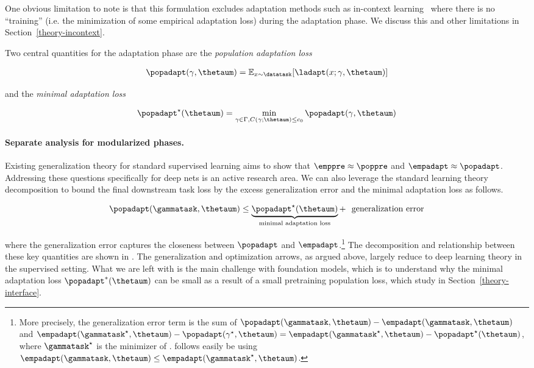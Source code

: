 One obvious limitation to note is that this formulation excludes adaptation methods such as in-context learning~\citep{brown2020gpt3} where there is no ``training'' (i.e. the minimization of some empirical adaptation loss) during the adaptation phase. We discuss this and other limitations in Section~\ref{theory-incontext}. 

Two central quantities for the adaptation phase are the \textit{population adaptation loss}

\begin{align}
    \popadapt(\gamma, \thetaum) = \ensuremath{\mathbb{E}}_{x\sim\datatask}[ \ladapt(x; \gamma,\thetaum)]
\end{align}

and the \emph{minimal adaptation loss}

\begin{align}
    \popadapt^\star(\thetaum) = \min_{\gamma \in \Gamma, C(\gamma;\thetaum)\le c_0}\popadapt(\gamma, \thetaum)
    \label{eqn:5}
\end{align}

\paragraph{Separate analysis for modularized phases.} Existing generalization theory for standard supervised learning aims to show that $\emppre\approx \poppre$ and $\empadapt\approx \popadapt$. 
Addressing these questions specifically for deep nets is an active research area. We can also leverage the standard learning theory decomposition to bound the final downstream task loss by the excess generalization error and the minimal adaptation loss as follows.

\begin{align}
    \popadapt(\gammatask, \thetaum) \le \underbrace{\popadapt^\star(\thetaum)}_{\textup{minimal adaptation loss}} + \textup{~~generalization error}
    \label{eqn:6}
\end{align}

where the generalization error captures the closeness between $\popadapt$ and $\empadapt$.\footnote{More precisely, the generalization error term is the sum of  $\popadapt(\gammatask, \thetaum) -  \empadapt(\gammatask, \thetaum)$ and $\empadapt(\gammatask^\star, \thetaum)-\popadapt(\gamma^\star, \thetaum) = \empadapt(\gammatask^\star, \thetaum)-\popadapt^\star(\thetaum)$, where $\gammatask^\star$ is the minimizer of .  follows easily be using $\empadapt(\gammatask, \thetaum)\le \empadapt(\gammatask^\star, \thetaum)$.}
The decomposition and relationship between these key quantities are shown in . 
The generalization and optimization arrows, as argued above, largely reduce to deep learning theory in the supervised setting. What we are left with is the main challenge with foundation models, which is to understand why the minimal adaptation loss $\popadapt^*(\thetaum)$ can be small as a result of a small pretraining population loss, which study in Section~\ref{theory-interface}.

